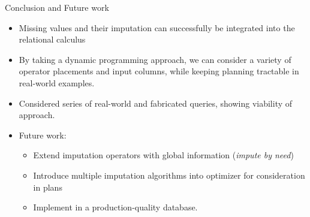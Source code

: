 \documentclass{beamer}
\begin{document}
\begin{frame}[fragile]{Conclusion and Future work}
\begin{itemize}
	\item Missing values and their imputation can successfully be integrated into the relational calculus
	\item By taking a dynamic programming approach, we can consider a variety of operator placements
and input columns, while keeping planning tractable in real-world examples.
	\item Considered series of real-world and fabricated queries, showing viability of approach.
	\item Future work:
		\begin{itemize}
			\item Extend imputation operators with global information (\textit{impute by need})
			\item Introduce multiple imputation algorithms into optimizer for consideration in plans \
			\item Implement in a production-quality database.
		\end{itemize}
\end{itemize}
\end{frame}
\end{document}
